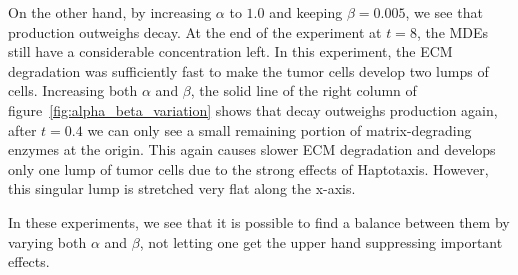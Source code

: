 On the other hand, by increasing $\alpha$ to $1.0$ and keeping $\beta=0.005$, we see that production outweighs decay. At the end of the experiment at $t=8$, the MDEs still have a considerable concentration left. In this experiment, the ECM degradation was sufficiently fast to make the tumor cells develop two lumps of cells. Increasing both $\alpha$ and $\beta$, the solid line of the right column of figure~\ref{fig:alpha_beta_variation} shows that decay outweighs production again, after $t=0.4$ we can only see a small remaining portion of matrix-degrading enzymes at the origin. This again causes slower ECM degradation and develops only one lump of tumor cells due to the strong effects of Haptotaxis. However, this singular lump is stretched very flat along the x-axis.

In these experiments, we see that it is possible to find a balance between them by varying both $\alpha$ and $\beta$, not letting one get the upper hand suppressing important effects.

